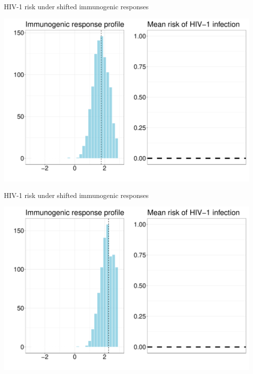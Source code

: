 \documentclass{beamer}
\begin{document}

\begin{frame}[c,noframenumbering]{HIV-1 risk under shifted immunogenic responses}

\hspace*{-1cm}\includegraphics[scale=0.4]{shift-9}

\note{
}

\end{frame}


\begin{frame}[c,noframenumbering]{HIV-1 risk under shifted immunogenic responses}

\hspace*{-1cm}\includegraphics[scale=0.4]{shift-10}

\note{
}

\end{frame}
\end{document}
